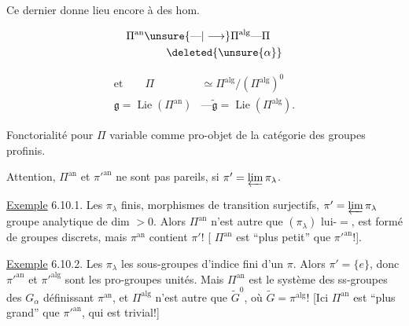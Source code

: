 Ce dernier donne lieu encore à des hom.

\[
\begin{aligned}
\Pi^{\mathrm{an}}&\unsure{\text{---}|\longrightarrow}\Pi^{\mathrm{alg}}\text{---}\Pi\\
&\qquad\deleted{\unsure{\alpha}}
\end{aligned}
\]

\[
\begin{aligned}
\text{et}\qquad\Pi&\simeq\Pi^{\mathrm{alg}}/(\Pi^{\mathrm{alg}})^0\\
\mathfrak g=\operatorname{Lie}(\Pi^{\mathrm{an}})&\text{---}\widetilde{\mathfrak g}=\operatorname{Lie}(\Pi^{\mathrm{alg}}).
\end{aligned}
\]

Fonctorialité pour $\Pi$ variable comme pro-objet de la catégorie des groupes profinis.

Attention, $\Pi^{\mathrm{an}}$ et  $\pi'^{\mathrm{an}}$ ne sont pas pareils, si $\pi'=\varprojlim\pi_\lambda$.  

\uline{Exemple} 6.10.1. Les $\pi_\lambda$ finis, morphismes de transition surjectifs, $\pi'=\varprojlim\pi_\lambda$ groupe analytique de dim $>0$. Alors $\Pi^{\mathrm{an}}$ n'est autre que $(\pi_\lambda)$ lui-$=$, est formé de groupes discrets, mais $\pi^{\mathrm{an}}$ contient  $\pi'$! [ $\Pi^{\mathrm{an}}$  est ``plus petit'' que $\pi'^{\mathrm{an}}$!].

\uline{Exemple} 6.10.2. Les $\pi_\lambda$ les sous-groupes d'indice fini d'un $\pi$. Alors $\pi'=\{e\}$, donc $\pi'^{\mathrm{an}}$ et $\pi'^{\mathrm{alg}}$ sont les pro-groupes unités. Mais $\Pi^{\mathrm{an}}$ est le système des ss-groupes  des $G_\alpha$ définissant $\pi^{\mathrm{an}}$, et $\Pi^{\mathrm{alg}}$ n'est autre que $\widetilde G^0$, où $\widetilde G=\pi^{\mathrm{alg}}$!  [Ici $\Pi^{\mathrm{an}}$ est ``plus grand'' que $\pi'^{\mathrm{an}}$, qui est trivial!]
